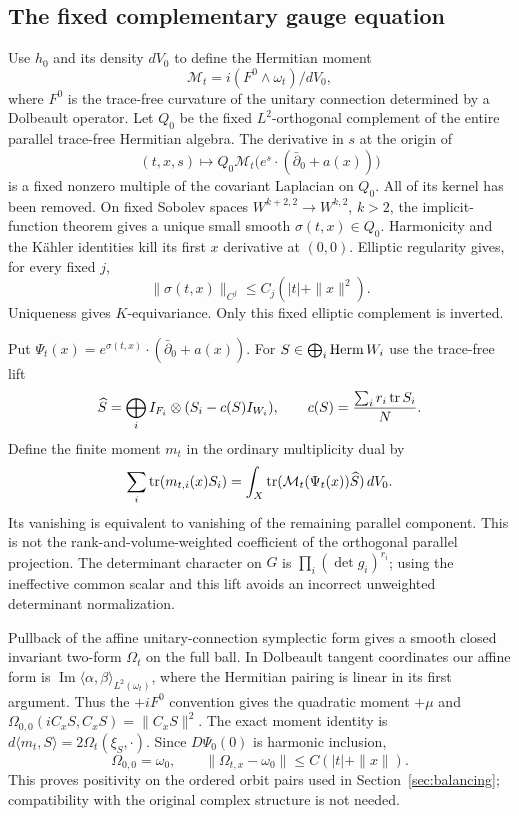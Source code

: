 \subsection{The fixed complementary gauge equation}
Use $h_0$ and its density $dV_0$ to define the Hermitian moment
\[
 \mathcal M_t=i(F^0\wedge\omega_t)/dV_0,
\]
where $F^0$ is the trace-free curvature of the unitary connection
determined by a Dolbeault operator. Let $Q_0$ be the fixed
$L^2$-orthogonal complement of the entire parallel trace-free
Hermitian algebra. The derivative in $s$ at the origin of
\[
 (t,x,s)\longmapsto
 Q_0\mathcal M_t\bigl(e^s\cdot(\bar\partial_0+a(x))\bigr)
\]
is a fixed nonzero multiple of the covariant Laplacian on $Q_0$.
All of its kernel has been removed. On fixed Sobolev spaces
$W^{k+2,2}\to W^{k,2}$, $k>2$, the implicit-function theorem gives
a unique small smooth $\sigma(t,x)\in Q_0$.
Harmonicity and the K\"ahler identities kill its first $x$ derivative
at $(0,0)$. Elliptic regularity gives, for every fixed $j$,
\begin{equation}\label{eq:complementary-correction}
 \|\sigma(t,x)\|_{C^j}\le C_j(|t|+\|x\|^2).
\end{equation}
Uniqueness gives $K$-equivariance.
Only this fixed elliptic complement is inverted.

Put $\Psi_t(x)=e^{\sigma(t,x)}\cdot(\bar\partial_0+a(x))$.
For $S\in\bigoplus_i\operatorname{Herm} W_i$ use the trace-free lift
\[
 \widehat S=\bigoplus_i I_{F_i}\otimes(S_i-c(S)I_{W_i}),
 \qquad c(S)=\frac{\sum_i r_i\operatorname{tr} S_i}{N}.
\]
Define the finite moment $m_t$ in the ordinary multiplicity dual by
\[
 \sum_i\operatorname{tr}(m_{t,i}(x)S_i)
   =\int_X\operatorname{tr}(\mathcal M_t(\Psi_t(x))\widehat S)\,dV_0.
\]
Its vanishing is equivalent to vanishing of the remaining parallel
component. This is not the rank-and-volume-weighted coefficient
of the orthogonal parallel projection. The determinant character
on $G$ is $\prod_i(\det g_i)^{r_i}$; using the ineffective common
scalar and this lift avoids an incorrect unweighted determinant
normalization.

Pullback of the affine unitary-connection symplectic form gives
a smooth closed invariant two-form $\Omega_t$ on the full ball.
In Dolbeault tangent coordinates our affine form is
$\operatorname{Im}\langle\alpha,\beta\rangle_{L^2(\omega_t)}$,
where the Hermitian pairing is linear in its first argument.
Thus the $+iF^0$ convention gives the quadratic moment $+\mu$
and $\Omega_{0,0}(iC_xS,C_xS)=\|C_xS\|^2$.
The exact moment identity is
$d\langle m_t,S\rangle=2\Omega_t(\xi_S,\cdot)$.
Since $D\Psi_0(0)$ is harmonic inclusion,
\begin{equation}\label{eq:ambient-form-estimate}
 \Omega_{0,0}=\omega_0,\qquad
 \|\Omega_{t,x}-\omega_0\|\le C(|t|+\|x\|).
\end{equation}
This proves positivity on the ordered orbit pairs used in
Section~\ref{sec:balancing}; compatibility with the original
complex structure is not needed.

